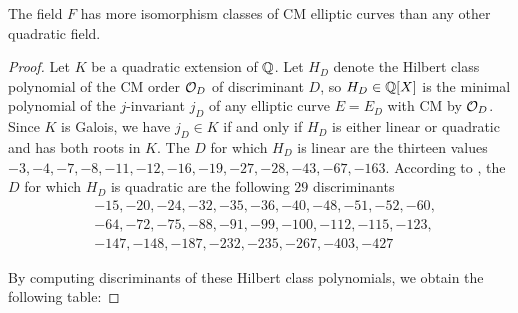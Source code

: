 \documentclass{amsart}
\begin{document}
\begin{proposition}
The field $F$ has more isomorphism classes of CM
elliptic curves than any other quadratic field.
\end{proposition}
\begin{proof}
Let $K$ be a quadratic extension of $\mathbb{Q}$.
Let $H_D$ denote the Hilbert class polynomial of the CM order
$\mathcal{O}_D$ of discriminant $D$, so $H_D\in \mathbb{Q}[X]$ is the minimal
polynomial of the $j$-invariant $j_D$ of any elliptic curve $E=E_D$ with
CM by $\mathcal{O}_D$.   Since $K$ is Galois, we have $j_D \in K$ if and only if
$H_D$ is either linear or quadratic and has both roots in $K$.
The $D$ for which $H_D$ is linear are the thirteen values
$-3, -4, -7, -8, -11, -12, -16, -19, -27, -28, -43, -67, -163$.
According to \cite{cremona:abvar}, the
$D$ for which $H_D$ is quadratic are the following $29$
discriminants
\begin{align*}
&-15, -20, -24, -32, -35, -36, -40, -48, -51, -52, -60, \\
&-64, -72, -75, -88, -91, -99, -100, -112, -115, -123, \\
&-147, -148, -187, -232, -235, -267, -403, -427
\end{align*}
 
By computing discriminants of these Hilbert class polynomials,
we obtain the following table:



\end{proof}
\end{document}

